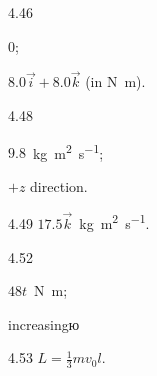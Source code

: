 \begin{Solution}{4.{46}}
		\begin{enumerate*}[label=(\alph*)]
			\item 0;
			\item $8.0 \vec i + 8.0 \vec k$ (in \si{\newton\meter}).
		\end{enumerate*}
	
\end{Solution}
\begin{Solution}{4.{48}}
		\begin{enumerate*}[label=(\alph*)]
			\item $9.8$~\si{\kilo\gram\square\meter\per\second};
			\item $+z$ direction.
		\end{enumerate*}
	
\end{Solution}
\begin{Solution}{4.{49}}
		$17.5 \vec k$~\si{\kilo\gram\square\meter\per\second}.
	
\end{Solution}
\begin{Solution}{4.{52}}
		\begin{enumerate*}[label=(\alph*)]
			\item $48t$~\si{\newton\meter};
			\item increasingю
		\end{enumerate*}
	
\end{Solution}
\begin{Solution}{4.{53}}
		$L = \frac13 mv_0l$.
	
\end{Solution}
